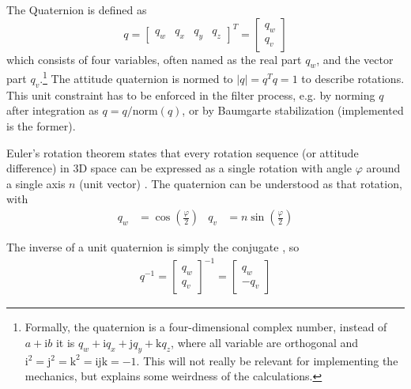 The Quaternion is defined as  
\begin{equation}
    q = \begin{bmatrix}
        q_w & q_x & q_y & q_z 
    \end{bmatrix}^T = 
    \begin{bmatrix}
        q_w \\ q_v
    \end{bmatrix}
\end{equation}
which consists of four variables, often named as the real part $q_w$, and the vector part $q_v$.\footnote{Formally, the quaternion is a four-dimensional complex number, instead of $a+\mathrm{i}b$ it is $q_w + \mathrm{i} q_x + \mathrm{j} q_y + \mathrm{k} q_z$, where all variable are orthogonal and $\mathrm{i}^2 = \mathrm{j}^2 = \mathrm{k}^2 = \mathrm{ijk} = -1$. This will not really be relevant for implementing the mechanics, but explains some weirdness of the calculations.}
The attitude quaternion is normed to $|q| = q^T q =  1$ to describe rotations.
This unit constraint has to be enforced in the filter process, e.g. by norming $q$ after integration \cite{sola2017} as $q = q / \mathrm{norm}(q)$, or by Baumgarte stabilization (implemented is the former).

Euler's rotation theorem states that every rotation sequence (or attitude difference) in 3D space can be expressed as a single rotation with angle $\varphi$ around a single axis $n$ (unit vector) \cite{zipfel2007}.
The quaternion can be understood as that rotation, with
\begin{align}
    q_w &= \cos(\frac{\varphi}{2}) 
    &
    q_v &= n \sin(\frac{\varphi}{2})
    \label{eq:rotation-theorem}
\end{align}

The inverse of a unit quaternion is simply the conjugate \cite{stevens2015, sola2017}, so 
\begin{align}
    q^{-1} = \begin{bmatrix}
        q_w \\ q_v
    \end{bmatrix}^{-1} = \begin{bmatrix}
        q_w \\ -q_v
    \end{bmatrix}
\end{align}

